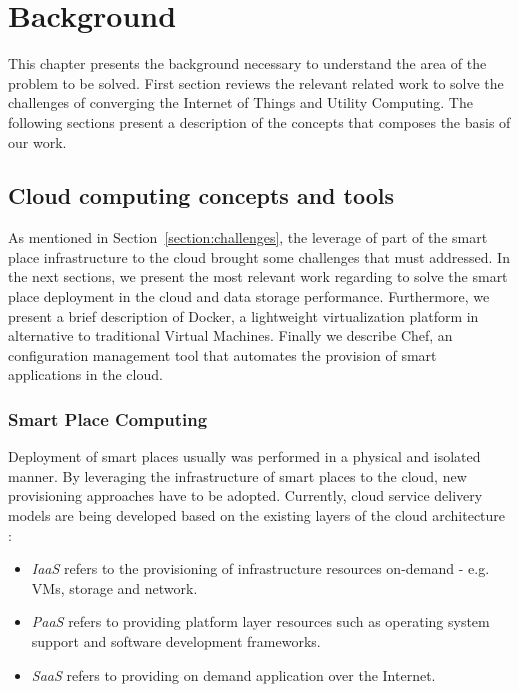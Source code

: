 
\chapter{Background}
\label{chapter:background}
This chapter presents the background necessary to understand the area of the problem to be solved.
First section reviews the relevant related work to solve the challenges of converging the Internet
of Things and Utility Computing. The following sections present a description of the concepts
that composes the basis of our work.

\section{Cloud computing concepts and tools}
\label{sub:cloud_concepts_tools}
As mentioned in Section~\ref{section:challenges}, the leverage of part of the smart place infrastructure
to the cloud brought some challenges that must addressed. In the next sections, we present the most
relevant work regarding to solve the smart place deployment in the cloud and data storage performance.
Furthermore, we present a brief description of Docker, a lightweight virtualization platform in
alternative to traditional Virtual Machines. Finally we describe Chef, an configuration management tool
that automates the provision of smart applications in the cloud.

\subsection{Smart Place Computing}
\label{sub:smart_place_computing}
Deployment of smart places usually was performed in a physical and isolated manner. By leveraging the
infrastructure of smart places to the cloud, new provisioning approaches have to be adopted. Currently,
cloud service delivery models are being developed based on the existing layers of the cloud
architecture \cite{zhang2010cloud}:

\begin{itemize}
  \item\textit{\gls{IaaS}} refers to the provisioning of infrastructure resources on-demand - e.g.
  \glspl{VM}, storage and network.
  \item\textit{\gls{PaaS}} refers to providing platform layer resources such as operating system support
  and software development frameworks.
  \item\textit{\gls{SaaS}} refers to providing on demand application over the Internet.
\end{itemize}

